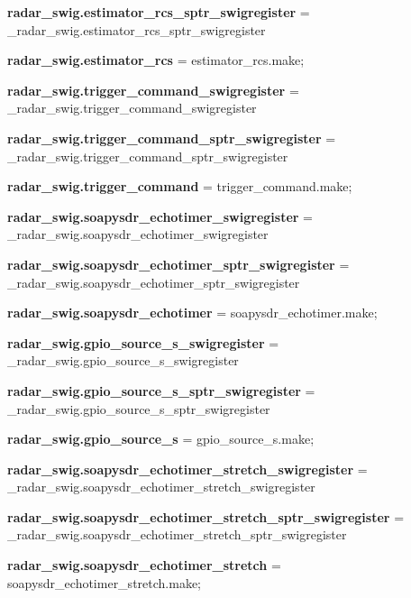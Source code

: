 \begin{DoxyCompactItemize}
\item 
{\bf radar\+\_\+swig.\+estimator\+\_\+rcs\+\_\+sptr\+\_\+swigregister} = \+\_\+radar\+\_\+swig.\+estimator\+\_\+rcs\+\_\+sptr\+\_\+swigregister
\item 
{\bf radar\+\_\+swig.\+estimator\+\_\+rcs} = estimator\+\_\+rcs.\+make;
\item 
{\bf radar\+\_\+swig.\+trigger\+\_\+command\+\_\+swigregister} = \+\_\+radar\+\_\+swig.\+trigger\+\_\+command\+\_\+swigregister
\item 
{\bf radar\+\_\+swig.\+trigger\+\_\+command\+\_\+sptr\+\_\+swigregister} = \+\_\+radar\+\_\+swig.\+trigger\+\_\+command\+\_\+sptr\+\_\+swigregister
\item 
{\bf radar\+\_\+swig.\+trigger\+\_\+command} = trigger\+\_\+command.\+make;
\item 
{\bf radar\+\_\+swig.\+soapysdr\+\_\+echotimer\+\_\+swigregister} = \+\_\+radar\+\_\+swig.\+soapysdr\+\_\+echotimer\+\_\+swigregister
\item 
{\bf radar\+\_\+swig.\+soapysdr\+\_\+echotimer\+\_\+sptr\+\_\+swigregister} = \+\_\+radar\+\_\+swig.\+soapysdr\+\_\+echotimer\+\_\+sptr\+\_\+swigregister
\item 
{\bf radar\+\_\+swig.\+soapysdr\+\_\+echotimer} = soapysdr\+\_\+echotimer.\+make;
\item 
{\bf radar\+\_\+swig.\+gpio\+\_\+source\+\_\+s\+\_\+swigregister} = \+\_\+radar\+\_\+swig.\+gpio\+\_\+source\+\_\+s\+\_\+swigregister
\item 
{\bf radar\+\_\+swig.\+gpio\+\_\+source\+\_\+s\+\_\+sptr\+\_\+swigregister} = \+\_\+radar\+\_\+swig.\+gpio\+\_\+source\+\_\+s\+\_\+sptr\+\_\+swigregister
\item 
{\bf radar\+\_\+swig.\+gpio\+\_\+source\+\_\+s} = gpio\+\_\+source\+\_\+s.\+make;
\item 
{\bf radar\+\_\+swig.\+soapysdr\+\_\+echotimer\+\_\+stretch\+\_\+swigregister} = \+\_\+radar\+\_\+swig.\+soapysdr\+\_\+echotimer\+\_\+stretch\+\_\+swigregister
\item 
{\bf radar\+\_\+swig.\+soapysdr\+\_\+echotimer\+\_\+stretch\+\_\+sptr\+\_\+swigregister} = \+\_\+radar\+\_\+swig.\+soapysdr\+\_\+echotimer\+\_\+stretch\+\_\+sptr\+\_\+swigregister
\item 
{\bf radar\+\_\+swig.\+soapysdr\+\_\+echotimer\+\_\+stretch} = soapysdr\+\_\+echotimer\+\_\+stretch.\+make;
\end{DoxyCompactItemize}
